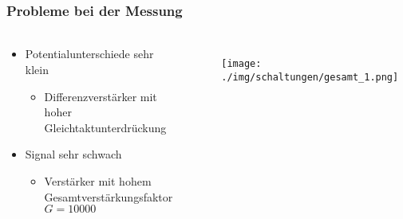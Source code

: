 \begin{frame}
    \frametitle{Probleme bei der Messung}
    \framesubtitle{}
    \begin{columns}[c]
    \begin{block}{}
        \begin{itemize}
            \item Potentialunterschiede sehr klein
            \begin{itemize}
                \item Differenzverstärker mit hoher
                Gleichtaktunterdrückung
            \end{itemize}
            \item Signal sehr schwach
            \pause
            \begin{itemize}
                \item Verstärker mit hohem Gesamtverstärkungsfaktor $G=10000$
            \end{itemize}
        \end{itemize}
    \end{block}
    \begin{figure}[H]
    \begin{center}
            \texttt{[image: ./img/schaltungen/gesamt\_1.png]}
    \end{center}
    \end{figure}
    \end{columns}
\end{frame}

